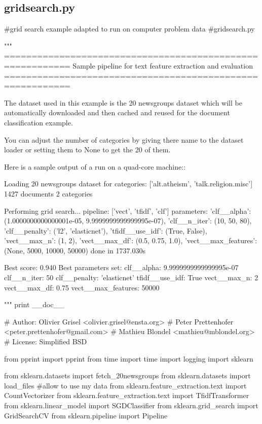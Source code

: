 \subsection{gridsearch.py}
\label{gridsearch.py}
\begin{pyverbatim}
 
#grid search example adapted to run on computer problem data
#gridsearch.py

"""
==========================================================
Sample pipeline for text feature extraction and evaluation
==========================================================

The dataset used in this example is the 20 newsgroups dataset which will be
automatically downloaded and then cached and reused for the document
classification example.

You can adjust the number of categories by giving there name to the dataset
loader or setting them to None to get the 20 of them.

Here is a sample output of a run on a quad-core machine::

  Loading 20 newsgroups dataset for categories:
  ['alt.atheism', 'talk.religion.misc']
  1427 documents
  2 categories

  Performing grid search...
  pipeline: ['vect', 'tfidf', 'clf']
  parameters:
  {'clf__alpha': (1.0000000000000001e-05, 9.9999999999999995e-07),
   'clf__n_iter': (10, 50, 80),
   'clf__penalty': ('l2', 'elasticnet'),
   'tfidf__use_idf': (True, False),
   'vect__max_n': (1, 2),
   'vect__max_df': (0.5, 0.75, 1.0),
   'vect__max_features': (None, 5000, 10000, 50000)}
  done in 1737.030s

  Best score: 0.940
  Best parameters set:
      clf__alpha: 9.9999999999999995e-07
      clf__n_iter: 50
      clf__penalty: 'elasticnet'
      tfidf__use_idf: True
      vect__max_n: 2
      vect__max_df: 0.75
      vect__max_features: 50000

"""
print __doc__

# Author: Olivier Grisel <olivier.grisel@ensta.org>
#         Peter Prettenhofer <peter.prettenhofer@gmail.com>
#         Mathieu Blondel <mathieu@mblondel.org>
# License: Simplified BSD

from pprint import pprint
from time import time
import logging
import sklearn

from sklearn.datasets import fetch_20newsgroups
from sklearn.datasets import load_files #allow to use my data
from sklearn.feature_extraction.text import CountVectorizer
from sklearn.feature_extraction.text import TfidfTransformer
from sklearn.linear_model import SGDClassifier
from sklearn.grid_search import GridSearchCV
from sklearn.pipeline import Pipeline


\end{pyverbatim}
